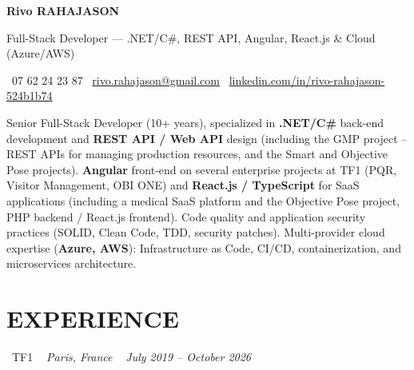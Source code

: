 \documentclass[10pt,a4paper]{article}
\begin{document}
\begin{center}
{\Huge \textbf{\color{ink}Rivo RAHAJASON}}

\vspace{4pt}

{\large \color{primary} Full-Stack Developer --- .NET/C\#, REST API, Angular, React.js \& Cloud (Azure/AWS)}

\vspace{6pt}

\color{darkgray} \faPhone\  07 62 24 23 87 \quad
\color{darkgray} \faEnvelope\ \href{mailto:rivo.rahajason@gmail.com}{rivo.rahajason@gmail.com} \quad
\color{darkgray} \faLinkedin\ \href{https://linkedin.com/in/rivo-rahajason-524b1b74}{linkedin.com/in/rivo-rahajason-524b1b74}

\vspace{10pt}

\begin{minipage}{\textwidth}
\small\color{darkgray}
Senior Full-Stack Developer (10+ years), specialized in \textbf{.NET/C\#} back-end development and \textbf{REST API / Web API} design (including the GMP project -- REST APIs for managing production resources, and the Smart and Objective Pose projects). \textbf{Angular} front-end on several enterprise projects at TF1 (PQR, Visitor Management, OBI ONE) and \textbf{React.js / TypeScript} for SaaS applications (including a medical SaaS platform and the Objective Pose project, PHP backend / React.js frontend). Code quality and application security practices (SOLID, Clean Code, TDD, security patches). Multi-provider cloud expertise (\textbf{Azure, AWS}): Infrastructure as Code, CI/CD, containerization, and microservices architecture.
\end{minipage}

\vspace{16pt}
\end{center}

\section*{EXPERIENCE}

\noindent\textcolor{primary}{ \faBuilding\ TF1} \quad
\textit{ \small \textcolor{darkgray}{ \faMapMarker\ } Paris, France } \hfill
\textit{ \small \textcolor{darkgray}{ \faCalendar\ } July 2019 -- October 2026 }

\vspace{4pt}
\end{document}
